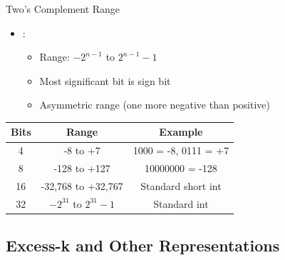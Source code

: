 \begin{frame}{Two's Complement Range}
\begin{itemize}
\item {}:
\begin{itemize}
\item Range: $-2^{n-1}$ to $2^{n-1}-1$
\item Most significant bit is sign bit
\item Asymmetric range (one more negative than positive)
\end{itemize}
\end{itemize}

\vspace{0.5cm}
\begin{center}
\begin{tabular}{|c|c|c|}
\hline
\textbf{Bits} & \textbf{Range} & \textbf{Example} \\
\hline
4 & -8 to +7 & 1000 = -8, 0111 = +7 \\
8 & -128 to +127 & 10000000 = -128 \\
16 & -32,768 to +32,767 & Standard short int \\
32 & $-2^{31}$ to $2^{31}-1$ & Standard int \\
\hline
\end{tabular}
\end{center}
\end{frame}

\subsection{Excess-k and Other Representations}

